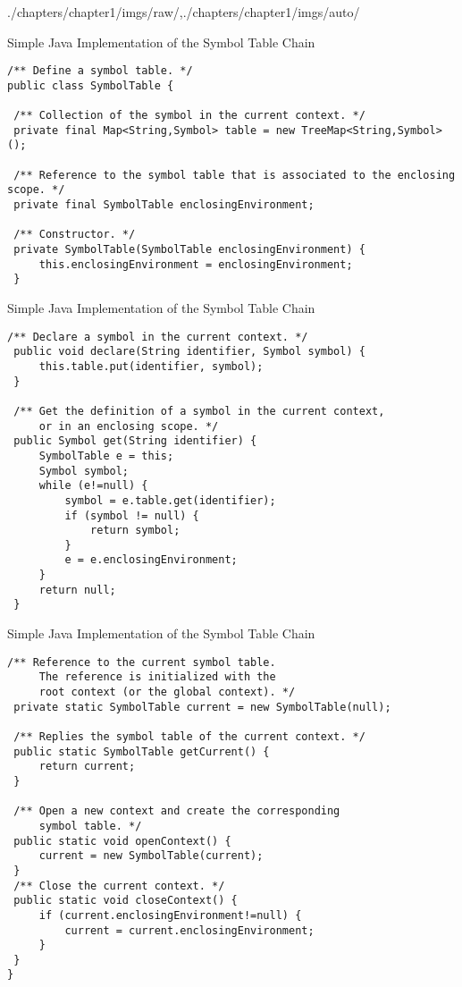 \begin{graphicspathcontext}{{./chapters/chapter1/imgs/raw/},{./chapters/chapter1/imgs/auto/}}
\begin{bibunit}[apalike]
\begin{frame}[t,fragile]{{Simple Java Implementation} of the Symbol Table Chain}
\begin{lstlisting}[style=lststyle-java]
/** Define a symbol table. */
public class SymbolTable {

 /** Collection of the symbol in the current context. */
 private final Map<String,Symbol> table = new TreeMap<String,Symbol>();

 /** Reference to the symbol table that is associated to the enclosing scope. */
 private final SymbolTable enclosingEnvironment;

 /** Constructor. */
 private SymbolTable(SymbolTable enclosingEnvironment) {
     this.enclosingEnvironment = enclosingEnvironment;
 }
	\end{lstlisting}
\end{frame}

\begin{frame}[t,fragile]{{Simple Java Implementation} of the Symbol Table Chain}
	\begin{lstlisting}[style=lststyle-java]
 /** Declare a symbol in the current context. */
 public void declare(String identifier, Symbol symbol) {
     this.table.put(identifier, symbol);
 }

 /** Get the definition of a symbol in the current context,
     or in an enclosing scope. */
 public Symbol get(String identifier) {
     SymbolTable e = this;
     Symbol symbol;
     while (e!=null) {
         symbol = e.table.get(identifier);
         if (symbol != null) {
             return symbol;
         }
         e = e.enclosingEnvironment;
     }
     return null;
 }
	\end{lstlisting}
\end{frame}

\begin{frame}[t,fragile]{{Simple Java Implementation} of the Symbol Table Chain}
	\begin{lstlisting}[style=lststyle-java]
 /** Reference to the current symbol table.
     The reference is initialized with the
     root context (or the global context). */
 private static SymbolTable current = new SymbolTable(null);

 /** Replies the symbol table of the current context. */
 public static SymbolTable getCurrent() {
     return current;
 }

 /** Open a new context and create the corresponding
     symbol table. */
 public static void openContext() {
     current = new SymbolTable(current);
 }
 /** Close the current context. */
 public static void closeContext() {
     if (current.enclosingEnvironment!=null) {
         current = current.enclosingEnvironment;
     }
 }
}
	\end{lstlisting}
\end{frame}


\end{bibunit}
\end{graphicspathcontext}
